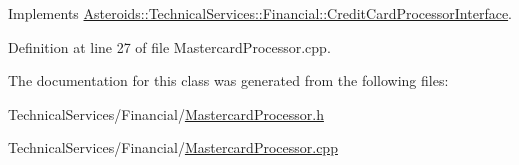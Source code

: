 Implements \hyperlink{classAsteroids_1_1TechnicalServices_1_1Financial_1_1CreditCardProcessorInterface_a8dcf97d20a9de55d04e0f84b4a788f78}{Asteroids\+::\+Technical\+Services\+::\+Financial\+::\+Credit\+Card\+Processor\+Interface}.



Definition at line 27 of file Mastercard\+Processor.\+cpp.



The documentation for this class was generated from the following files\+:\begin{DoxyCompactItemize}
\item 
Technical\+Services/\+Financial/\hyperlink{MastercardProcessor_8h}{Mastercard\+Processor.\+h}\item 
Technical\+Services/\+Financial/\hyperlink{MastercardProcessor_8cpp}{Mastercard\+Processor.\+cpp}\end{DoxyCompactItemize}
